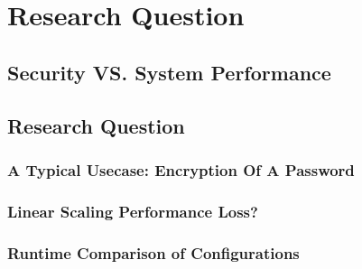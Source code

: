 \chapter{Research Question}

\section{Security VS. System Performance}



\section{Research Question}

\subsection{A Typical Usecase: Encryption Of A Password}

\subsection{Linear Scaling Performance Loss?}

\subsection{Runtime Comparison of Configurations}

